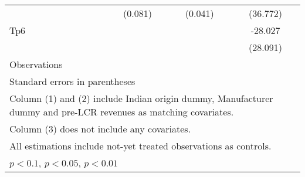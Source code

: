 {\begin{tabular}{l*{3}{c}}
                    &     (0.081)         &     (0.041)         &    (36.772)         \\
[1em]
Tp6                 &                     &                     &     -28.027         \\
                    &                     &                     &    (28.091)         \\
\hline
Observations        &                     &                     &                     \\
\hline\hline
\multicolumn{4}{l}{\footnotesize Standard errors in parentheses}\\
\multicolumn{4}{l}{\footnotesize Column (1) and (2) include Indian origin dummy, Manufacturer dummy and pre-LCR revenues as matching covariates.}\\
\multicolumn{4}{l}{\footnotesize Column (3) does not include any covariates.}\\
\multicolumn{4}{l}{\footnotesize All estimations include not-yet treated observations as controls.}\\
\multicolumn{4}{l}{\footnotesize \sym{*} \(p<0.1\), \sym{**} \(p<0.05\), \sym{***} \(p<0.01\)}\\
\end{tabular}
}
